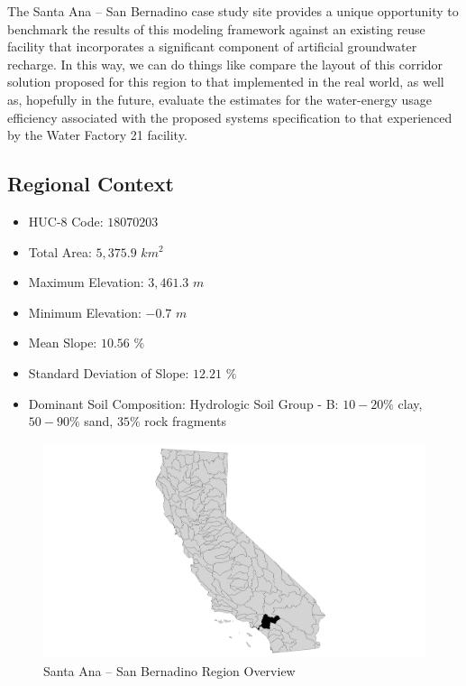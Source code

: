 The Santa Ana -- San Bernadino case study site provides a unique opportunity to benchmark the results of this modeling framework against an existing reuse facility that incorporates a significant component of artificial groundwater recharge. In this way, we can do things like compare the layout of this corridor solution proposed for this region to that implemented in the real world, as well as, hopefully in the future, evaluate the estimates for the water-energy usage efficiency associated with the proposed systems specification to that experienced by the Water Factory 21 facility. 

    \subsection{Regional Context}

    \begin{itemize}
      \setlength{\itemsep}{0cm}
      \setlength{\parskip}{0cm}
        \item HUC-8 Code: $18070203$
        \item Total Area: $5,375.9$ $km^2$
        \item Maximum Elevation: $3,461.3$ $m$
        \item Minimum Elevation: $-0.7$ $m$
        \item Mean Slope: $10.56$ $\%$
        \item Standard Deviation of Slope: $12.21$ $\%$
        \item Dominant Soil Composition: Hydrologic Soil Group - B: $10-20\%$ clay, $50-90\%$ sand, $35\%$ rock fragments
    \end{itemize}
    
        \begin{figure}[!h]
            \begin{center}
            \includegraphics[width=5.5in]{figures/SanBernadino_Overview.png}   
            \caption{Santa Ana -- San Bernadino Region Overview}
            \label{fig:SASBoverview}
            \end{center}
        \end{figure}

